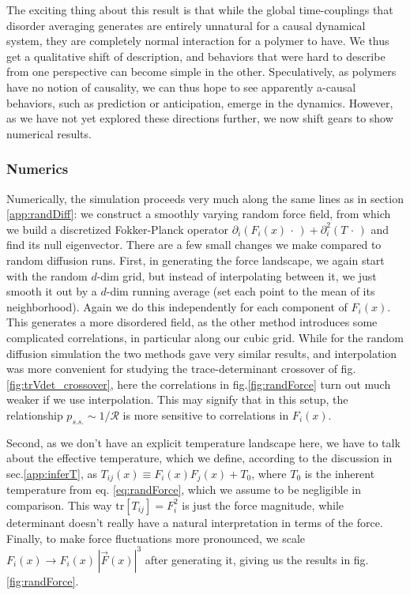 \documentclass[reprint,prx]{revtex4-1}
\newcommand{\tr}{\mbox{tr}}
\renewcommand{\=}[1]{\stackrel{#1}{=}} %
\renewcommand{\(}{\left (}
\renewcommand{\)}{\right  )}
\renewcommand{\[}{\left [}
\renewcommand{\]}{\right ]}
\newcommand{\<}{\left <}
\renewcommand{\>}{\right >}
\theoremstyle{definition}
\theoremstyle{remark}
\begin{document}
The exciting thing about this result is that while the global time-couplings that disorder averaging generates are entirely unnatural for a causal dynamical system, they are completely normal interaction for a polymer to have. We thus get a qualitative shift of description, and behaviors that were hard to describe from one perspective can become simple in the other. Speculatively, as polymers have no notion of causality, we can thus hope to see apparently a-causal behaviors, such as prediction or anticipation, emerge in the dynamics. However, as we have not yet explored these directions further, we now shift gears to show numerical results.

\subsubsection{Numerics}
Numerically, the simulation proceeds very much along the same lines as in section \ref{app:randDiff}: we construct a smoothly varying random force field, from which we build a discretized Fokker-Planck operator $ \partial_i(F_i(x)\,\cdot\,) + \partial_i^2(T\,\cdot\,) $ and find its null eigenvector. There are a few small changes we make compared to random diffusion runs. First, in generating the force landscape, we again start with the random $ d $-dim grid, but instead of interpolating between it, we just smooth it out by a $ d $-dim running average (set each point to the mean of its neighborhood). Again we do this independently for each component of $ F_i(x) $. This generates a more disordered field, as the other method introduces some complicated correlations, in particular along our cubic grid. While for the random diffusion simulation the two methods gave very similar results, and interpolation was more convenient for studying the trace-determinant crossover of fig.\ref{fig:trVdet_crossover}, here the correlations in fig.\ref{fig:randForce} turn out much weaker if we use interpolation. This may signify that in this setup, the relationship $ p_{s.s.}\sim 1/\mathcal{R} $ is more sensitive to correlations in $ F_{i}(x) $.

Second, as we don't have an explicit temperature landscape here, we have to talk about the effective temperature, which we define, according to the discussion in sec.\ref{app:inferT}, as $ T_{ij}(x)\equiv F_i(x)F_j(x) + T_0 $, where $ T_0 $ is the inherent temperature from eq. \ref{eq:randForce}, which we assume to be negligible in comparison. This way $ \tr\[T_{ij}\] = F_i^2 $ is just the force magnitude, while determinant doesn't really have a natural interpretation in terms of the force. Finally, to make force fluctuations more pronounced, we scale $ F_i(x) \rightarrow F_i(x)\, |\vec{F}(x)|^3 $ after generating it, giving us the results in fig.\ref{fig:randForce}. 
\end{document}
